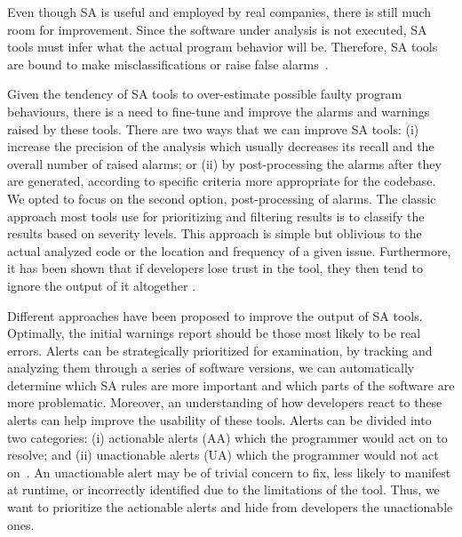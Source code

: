 
Even though SA is useful and employed by real companies, there is still much room for improvement. Since the software under analysis is not executed, SA tools must infer what the actual program behavior will be. Therefore, SA tools are bound to make misclassifications or raise false alarms~\cite{cheirdari2018}. 


Given the tendency of SA tools to over-estimate possible faulty program behaviours, there is a need to fine-tune and improve the alarms and warnings raised by these tools. There are two ways that we can improve SA tools: (i) increase the precision of the analysis which usually decreases its recall and the overall number of raised alarms; or (ii) by post-processing the alarms after they are generated, according to specific criteria more appropriate for the codebase. We opted to focus on the second option, post-processing of alarms. 
The classic approach most tools use for prioritizing and filtering results is to classify the results based on severity levels. This approach is simple but oblivious to the actual analyzed code or the location and frequency of a given issue. Furthermore, it has been shown that if developers lose trust in the tool, they then tend to ignore the output of it altogether \cite{sa_google}.

Different approaches have been proposed to improve the output of SA tools. Optimally, the initial warnings report should be those most likely to be real errors. Alerts can be strategically prioritized for examination, by tracking and analyzing them through a series of software versions, we can automatically determine which SA rules are more important and which parts of the software are more problematic. 
Moreover, an understanding of how developers react to these alerts can help improve the usability of these tools. Alerts can be divided into two categories: (i) actionable alerts (AA) which the programmer would act on to resolve; and (ii) unactionable alerts (UA) which the programmer would not act on~\cite{comparative_heckman, actionable_sa}. An unactionable alert may be of trivial concern to fix, less likely to manifest at runtime, or incorrectly identified due to the limitations of the tool. Thus, we want to prioritize the actionable alerts and hide from developers the unactionable ones.


